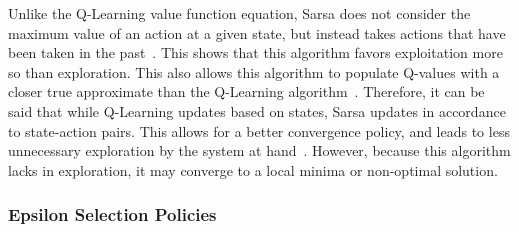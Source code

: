 \documentclass[12pt,american]{report}
\begin{document}
        Unlike the Q-Learning value function equation, Sarsa does not consider the maximum value of an action at a given state, but instead takes actions that have been taken in the past~\cite{Eden}. This shows that this algorithm favors exploitation more so than exploration. This also allows this algorithm to populate Q-values with a closer true approximate than the Q-Learning algorithm~\cite{sprague2003multiple}. Therefore, it can be said that while Q-Learning updates based on states, Sarsa updates in accordance to state-action pairs.  This allows for a better convergence policy, and leads to less unnecessary exploration by the system at hand~\cite{sutton1996generalization}.  However, because this algorithm lacks in exploration, it may converge to a local minima or non-optimal solution.

        \subsubsection{Epsilon Selection Policies}
\end{document}
